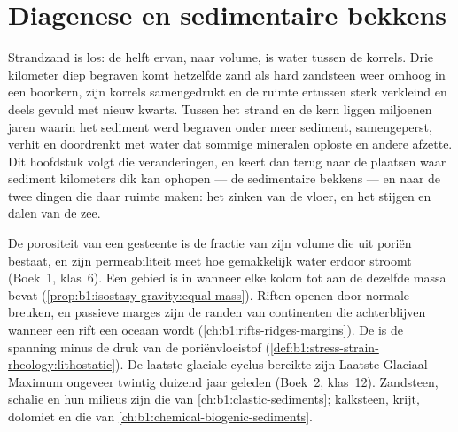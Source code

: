 \chapter{Diagenese en sedimentaire bekkens}\label{ch:b1:diagenesis-basins}

Strandzand is los: de helft ervan, naar volume, is water tussen de korrels. Drie kilometer diep begraven komt hetzelfde zand als hard zandsteen weer omhoog in een boorkern, zijn korrels samengedrukt en de ruimte ertussen sterk verkleind en deels gevuld met nieuw kwarts. Tussen het strand en de kern liggen miljoenen jaren waarin het sediment werd begraven onder meer sediment, samengeperst, verhit en doordrenkt met water dat sommige mineralen oploste en andere afzette. Dit hoofdstuk volgt die veranderingen, en keert dan terug naar de plaatsen waar sediment kilometers dik kan ophopen --- de sedimentaire bekkens --- en naar de twee dingen die daar ruimte maken: het zinken van de vloer, en het stijgen en dalen van de zee.

\begin{recall}
De porositeit van een gesteente is de fractie van zijn volume die uit poriën bestaat, en zijn permeabiliteit meet hoe gemakkelijk water erdoor stroomt (Boek~1, klas~6). Een gebied is in  wanneer elke kolom tot aan de  dezelfde massa bevat (\cref{prop:b1:isostasy-gravity:equal-mass}). Riften openen door normale breuken, en passieve marges zijn de randen van continenten die achterblijven wanneer een rift een oceaan wordt (\cref{ch:b1:rifts-ridges-margins}). De  is de spanning minus de druk van de poriënvloeistof (\cref{def:b1:stress-strain-rheology:lithostatic}). De laatste glaciale cyclus bereikte zijn Laatste Glaciaal Maximum ongeveer twintig duizend jaar geleden (Boek~2, klas~12). Zandsteen, schalie en hun milieus zijn die van \cref{ch:b1:clastic-sediments}; kalksteen, krijt, dolomiet en  die van \cref{ch:b1:chemical-biogenic-sediments}.
\end{recall}

